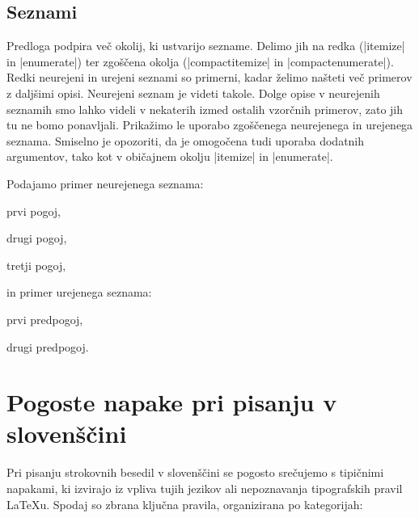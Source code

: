 \documentclass[9pt]{style/friteza}
\begin{document}
\subsection{Seznami}

Predloga podpira več okolij, ki ustvarijo sezname. Delimo jih na redka (\ltx|itemize| in \ltx|enumerate|) ter zgoščena okolja (\ltx|compactitemize| in \ltx|compactenumerate|). Redki neurejeni in urejeni seznami so primerni, kadar želimo našteti več primerov z daljšimi opisi. Neurejeni seznam je videti takole. Dolge opise v neurejenih seznamih smo lahko videli v nekaterih izmed ostalih vzorčnih primerov, zato jih tu ne bomo ponavljali. Prikažimo le uporabo zgoščenega neurejenega in urejenega seznama. Smiselno je opozoriti, da je omogočena tudi uporaba dodatnih argumentov, tako kot v običajnem okolju \ltx|itemize| in \ltx|enumerate|.

Podajamo primer neurejenega seznama:
\begin{compactitemize}
 \item prvi pogoj,
 \item drugi pogoj,
 \item tretji pogoj,
\end{compactitemize}
in primer urejenega seznama:
\begin{compactenumerate}[label=\alph*)]
\item prvi predpogoj,
\item drugi predpogoj.
\end{compactenumerate}

\section{Pogoste napake pri pisanju v slovenščini}
\label{sec:slo}

Pri pisanju strokovnih besedil v slovenščini se pogosto srečujemo s tipičnimi napakami, ki izvirajo iz vpliva tujih jezikov ali nepoznavanja tipografskih pravil \LaTeX u. Spodaj so zbrana ključna pravila, organizirana po kategorijah:
\end{document}
